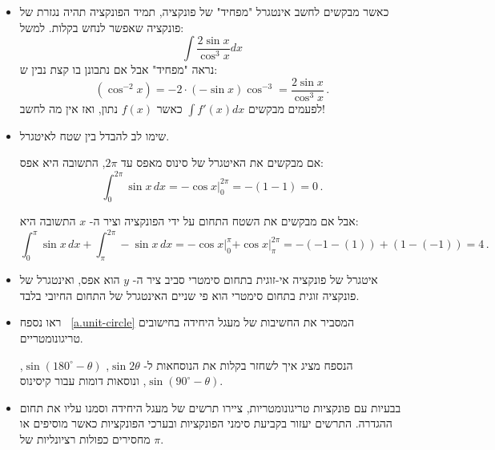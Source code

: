 \begin{itemize}
\item
כאשר מבקשים לחשב אינטגרל "מפחיד" של פונקציה, תמיד הפונקציה תהיה נגזרת של פונקציה שאפשר לנחש בקלות. למשל:
\[
\int\frac{2\sin x}{\cos^3 x}dx
\]
נראה "מפחיד" אבל אם נתבונן בו קצת נבין ש:
\[
(\cos^{-2} x)=-2\cdot (-\sin x) \cos^{-3}=\frac{2\sin x}{\cos^3 x}\,.
\]
לפעמים מבקשים
$\displaystyle\int f'(x) dx$
כאשר 
$f(x)$
נתון, ואז אין מה לחשב!

\np

\item 
שימו לב להבדל בין שטח לאיטגרל.

\begin{center}
\end{center}

אם מבקשים את האיטגרל של סינוס מאפס עד 
$2\pi$,
התשובה היא אפס:
\[
\int_0^{2\pi} \sin x\, dx =-\left.\cos x\right|_0^{2\pi}= -(1-1)=0\,.
\]

\vspace{-4ex}

אבל אם מבקשים את השטח התחום על ידי הפונקציה וציר ה-%
$x$
התשובה היא:
\[
\int_0^{\pi} \sin x\, dx + \int_{\pi}^{2\pi} -\sin x\, dx = -\left.\cos x\right|_0^{\pi} \left.+\cos x\right|_{\pi}^{2\pi}= -(-1-(1))+(1-(-1))=4\,.
\]

\vspace{-4ex}


\item
איטגרל של פונקציה אי-זוגית בתחום סימטרי סביב ציר ה-%
$y$
הוא אפס, ואינטגרל של פונקציה זוגית בתחום סימטרי הוא פי שניים האינטגרל של התחום החיובי בלבד.


\item
ראו נספח~%
\ref{a.unit-circle}
המסביר את החשיבות של מעגל היחידה בחישובים טריגונומטריים.

הנספח מציג איך לשחזר בקלות את הנוסחאות ל-%
$\sin 2\theta$, $\sin (180^\circ-\theta)$, $\sin (90^\circ-\theta)$,
ונוסאות דומות עבור קיסינוס.

\item
בבעיות עם פונקציות טריגונומטריות, ציירו תרשים של מעגל היחידה וסמנו עליו את תחום ההגדרה. התרשים יעזור בקביעת סימני הפונקציות ובערכי הפונקציות כאשר מוסיפים או מחסירים כפולות רציונליות של 
$\pi$.


\end{itemize}
